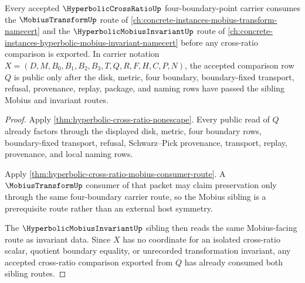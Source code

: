 \begin{theorem}
\label{thm:hyperbolic-cross-ratio-mobius-sibling-route}
Every accepted $\HyperbolicCrossRatioUp$ four-boundary-point carrier consumes the $\MobiusTransformUp$ route of \autoref{ch:concrete-instances-mobius-transform-namecert} and the $\HyperbolicMobiusInvariantUp$ route of \autoref{ch:concrete-instances-hyperbolic-mobius-invariant-namecert} before any cross-ratio comparison is exported. In carrier notation $X=(D,M,B_0,B_1,B_2,B_3,T,Q,R,F,H,C,P,N)$, the accepted comparison row $Q$ is public only after the disk, metric, four boundary, boundary-fixed transport, refusal, provenance, replay, package, and naming rows have passed the sibling Mobius and invariant routes.
\end{theorem}
\begin{proof}
Apply \autoref{thm:hyperbolic-cross-ratio-nonescape}. Every public read of $Q$ already factors through the displayed disk, metric, four boundary rows, boundary-fixed transport, refusal, Schwarz--Pick provenance, transport, replay, provenance, and local naming rows.

Apply \autoref{thm:hyperbolic-cross-ratio-mobius-consumer-route}. A $\MobiusTransformUp$ consumer of that packet may claim preservation only through the same four-boundary carrier route, so the Mobius sibling is a prerequisite route rather than an external host symmetry.

The $\HyperbolicMobiusInvariantUp$ sibling then reads the same Mobius-facing route as invariant data. Since $X$ has no coordinate for an isolated cross-ratio scalar, quotient boundary equality, or unrecorded transformation invariant, any accepted cross-ratio comparison exported from $Q$ has already consumed both sibling routes.
\end{proof}

